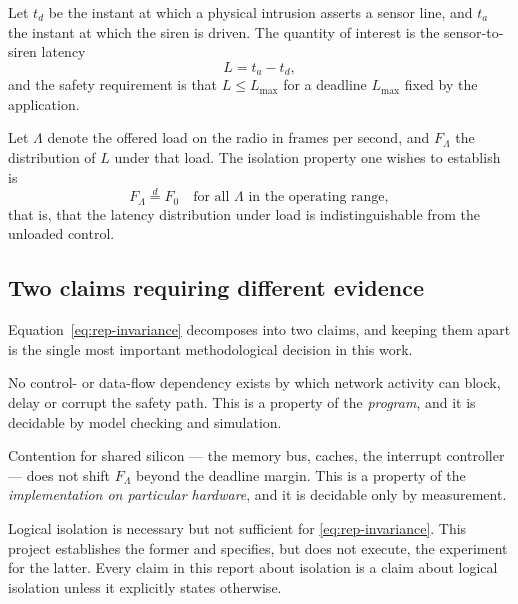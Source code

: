 Let $t_{d}$ be the instant at which a physical intrusion asserts a sensor line, and $t_{a}$ the
instant at which the siren is driven. The quantity of interest is the sensor-to-siren latency
\begin{equation}
L = t_{a} - t_{d},
\label{eq:rep-latency}
\end{equation}
and the safety requirement is that $L \le L_{\max}$ for a deadline $L_{\max}$ fixed by the
application.

Let $\Lambda$ denote the offered load on the radio in frames per second, and $F_{\Lambda}$ the
distribution of $L$ under that load. The isolation property one wishes to establish is
\begin{equation}
F_{\Lambda} \stackrel{d}{=} F_{0} \quad \text{for all } \Lambda \text{ in the operating range},
\label{eq:rep-invariance}
\end{equation}
that is, that the latency distribution under load is indistinguishable from the unloaded
control.

\subsection{Two claims requiring different evidence}

Equation~\eqref{eq:rep-invariance} decomposes into two claims, and keeping them apart is the
single most important methodological decision in this work.

\begin{description}[leftmargin=1.8em,itemsep=4pt]
  \item[Logical isolation.] No control- or data-flow dependency exists by which network
        activity can block, delay or corrupt the safety path. This is a property of the
        \emph{program}, and it is decidable by model checking and simulation.
  \item[Timing isolation.] Contention for shared silicon — the memory bus, caches, the
        interrupt controller — does not shift $F_{\Lambda}$ beyond the deadline margin. This is
        a property of the \emph{implementation on particular hardware}, and it is decidable only
        by measurement.
\end{description}

Logical isolation is necessary but not sufficient for \eqref{eq:rep-invariance}. This project
establishes the former and specifies, but does not execute, the experiment for the latter. Every
claim in this report about isolation is a claim about logical isolation unless it explicitly
states otherwise.

